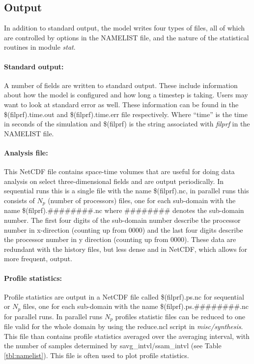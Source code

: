 \documentclass[11pt,a4paper]{article}
\begin{document}
\subsection{Output}
In addition to standard output, the model writes four types of files,
all of which are controlled by options in the NAMELIST file, and the
nature of the statistical routines in module \emph{stat}.

\paragraph{Standard output:}  A number of fields are written to
standard output. These include information about how the model is
configured and how long a timestep is taking. Users may want to look
at standard error as well. These information can be found in the
\$(filprf).time.out and \$(filprf).time.err file respectively.
Where ``time'' is the time in seconds of the simulation and
\$(filprf) is the string associated with \emph{filprf} in
the NAMELIST file.

\paragraph{Analysis file:}  This NetCDF file contains space-time
volumes that are useful for doing data analysis on select 
three-dimensional fields and are output periodically.
In sequential runs this is a single file with the name \$(filprf).nc,
in parallel runs this consists of $N_p$ (number of processors) files,
one for each sub-domain with the name \$(filprf).\#\#\#\#\#\#\#\#.nc
where \#\#\#\#\#\#\#\# denotes the sub-domain number. The first four
digits of the sub-domain number describe the processor number in
x-direction (counting up from 0000) and the last four digits describe
the processor number in y direction (counting up from 0000).
These data are redundant with the history files, but less dense and
in NetCDF, which allows for more frequent, output.

\paragraph{Profile statistics:}  Profile statistics are output in a
NetCDF file called \$(filprf).ps.nc for sequential or $N_p$ files,
one for each sub-domain with the name \$(filprf).ps.\#\#\#\#\#\#\#\#.nc
for parallel runs. In parallel runs $N_p$ profiles statistic files
can be reduced to one file valid for the whole domain by using the
reduce.ncl script in \emph{misc/synthesis}. This file than contains
profile statistics averaged over the averaging interval,
with the number of samples determined by savg\_intvl/ssam\_intvl
(see Table \ref{tbl:namelist}). This file is often used to plot
profile statistics.
\end{document}
